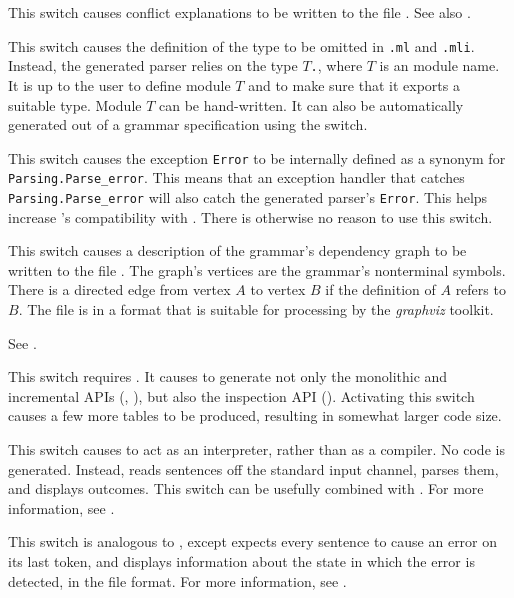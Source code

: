 \documentclass[onecolumn,11pt,nocopyrightspace,preprint]{sigplanconf}
\begin{document}
\docswitch{\oexplain} This switch causes conflict explanations to be
written  to the file \conflicts. See also .

 This switch causes the definition of
the \token type to be omitted in \texttt{.ml} and
\texttt{.mli}. Instead, the generated parser relies on
the type $T$\texttt{.}\token, where $T$ is an \ocaml module name. It is up to
the user to define module $T$ and to make sure that it exports a suitable
\token type. Module $T$ can be hand-written. It can also be automatically generated
out of a grammar specification using the \oonlytokens switch.

\docswitch{\ofixedexc} This switch causes the exception \texttt{Error} to be
internally defined as a synonym for \texttt{Parsing.Parse\_error}. This means
that an exception handler that catches \texttt{Parsing.Parse\_error} will also
catch the generated parser's \texttt{Error}. This helps increase \menhir's
compatibility with \ocamlyacc. There is otherwise no reason to use this switch.

\docswitch{\ograph} This switch causes a description of the grammar's
dependency graph to be written to the file \dott. The graph's
vertices are the grammar's nonterminal symbols. There is a directed edge from
vertex $A$ to vertex $B$ if the definition of $A$ refers to $B$. The file is
in a format that is suitable for processing by the \emph{graphviz} toolkit.

\docswitch{\oinfer, \oinferwrite, \oinferread} See .

\docswitch{\oinspection} This switch requires \otable. It causes \menhir to generate
not only the monolithic and incremental APIs (,
), but also the inspection API ().
Activating this switch causes a few more tables to be produced, resulting in
somewhat larger code size.

\docswitch{\ointerpret} This switch causes \menhir to act as an interpreter,
rather than as a compiler. No \ocaml code is generated. Instead, \menhir
reads sentences off the standard input channel, parses them, and displays
outcomes. This switch can be usefully combined with \otrace.
For more information, see .

\docswitch{\ointerpreterror} This switch is analogous to \ointerpret, except
\menhir expects every sentence to cause an error on its last token, and
displays information about the state in which the error is detected, in
the \messages file format. For more information, see .
\end{document}
